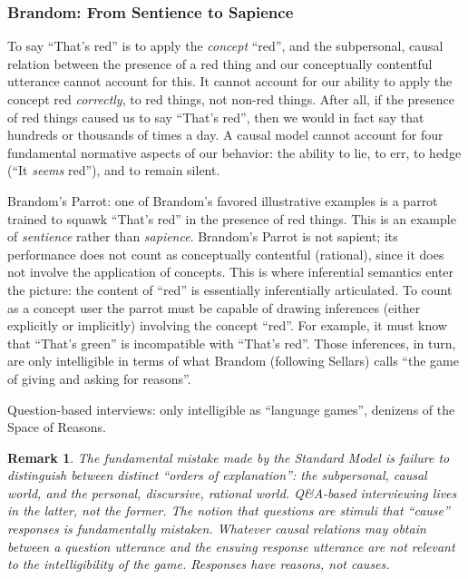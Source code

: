 \documentclass[11pt,twoside]{article}
\newtheorem{remark}{Remark}
\newcommand{\SM}{Standard Model}
\begin{document}
\subsubsection{Brandom: From Sentience to Sapience}

To say ``That's red'' is to apply the \textit{concept} ``red'', and
the subpersonal, causal relation between the presence of a red thing
and our conceptually contentful utterance cannot account for this.  It
cannot account for our ability to apply the concept red
\textit{correctly}, to red things, not non-red things.  After all, if
the presence of red things caused us to say ``That's red'', then we
would in fact say that hundreds or thousands of times a day.  A causal
model cannot account for four fundamental normative aspects of our
behavior: the ability to lie, to err, to hedge (``It \textit{seems}
red''), and to remain silent.

Brandom's Parrot: one of Brandom's favored illustrative examples is a
parrot trained to squawk ``That's red'' in the presence of red things.
This is an example of \textit{sentience} rather than
\textit{sapience}.  Brandom's Parrot is not sapient; its performance
does not count as conceptually contentful (rational), since it does
not involve the application of concepts.  This is where inferential
semantics enter the picture: the content of ``red'' is essentially
inferentially articulated.  To count as a concept user the parrot must
be capable of drawing inferences (either explicitly or implicitly)
involving the concept ``red''.  For example, it must know that
``That's green'' is incompatible with ``That's red''.  Those
inferences, in turn, are only intelligible in terms of what Brandom
(following Sellars) calls ``the game of giving and asking for
reasons''.

Question-based interviews: only intelligible as ``language games'',
denizens of the Space of Reasons.

\begin{remark}
  The fundamental mistake made by the \SM{} is failure to distinguish
  between distinct ``orders of explanation'': the subpersonal, causal
  world, and the personal, discursive, rational world.  Q\&A-based
  interviewing lives in the latter, not the former.  The notion that
  questions are stimuli that ``cause'' responses is fundamentally
  mistaken.  Whatever causal relations may obtain between a question
  utterance and the ensuing response utterance are not relevant to the
  intelligibility of the game.  Responses have \textit{reasons}, not
  causes.
\end{remark}
\end{document}
